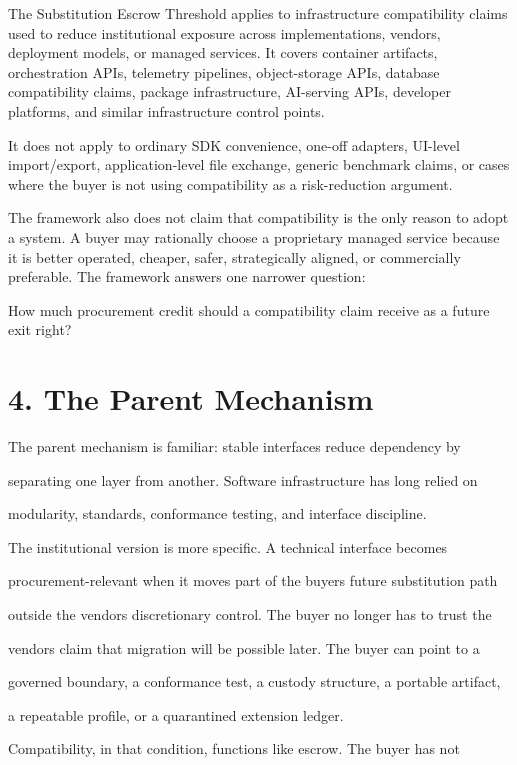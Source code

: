 \documentclass[11pt]{article}
\begin{document}
The Substitution Escrow Threshold applies to infrastructure compatibility claims used to reduce institutional exposure across implementations, vendors, deployment models, or managed services. It covers container artifacts, orchestration APIs, telemetry pipelines, object-storage APIs, database compatibility claims, package infrastructure, AI-serving APIs, developer platforms, and similar infrastructure control points.

It does not apply to ordinary SDK convenience, one-off adapters, UI-level import/export, application-level file exchange, generic benchmark claims, or cases where the buyer is not using compatibility as a risk-reduction argument.

The framework also does not claim that compatibility is the only reason to adopt a system. A buyer may rationally choose a proprietary managed service because it is better operated, cheaper, safer, strategically aligned, or commercially preferable. The framework answers one narrower question:

How much procurement credit should a compatibility claim receive as a future exit right?

\section{4. The Parent Mechanism}\label{the-parent-mechanism}

The parent mechanism is familiar: stable interfaces reduce dependency by

separating one layer from another. Software infrastructure has long relied on

modularity, standards, conformance testing, and interface discipline.

The institutional version is more specific. A technical interface becomes

procurement-relevant when it moves part of the buyer\textquotesingle s future substitution path

outside the vendor\textquotesingle s discretionary control. The buyer no longer has to trust the

vendor\textquotesingle s claim that migration will be possible later. The buyer can point to a

governed boundary, a conformance test, a custody structure, a portable artifact,

a repeatable profile, or a quarantined extension ledger.

Compatibility, in that condition, functions like escrow. The buyer has not
\end{document}
